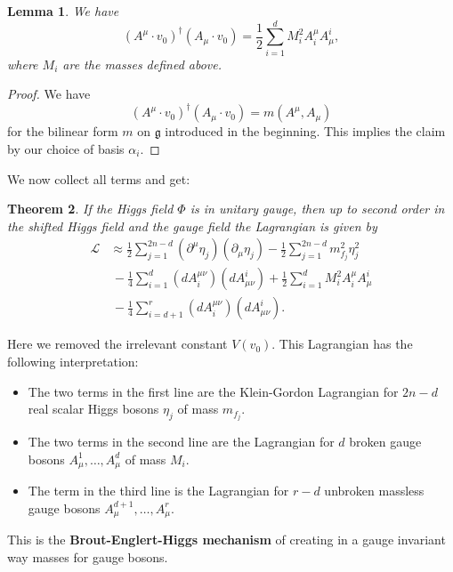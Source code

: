 \documentclass[11pt]{amsart}
\newtheorem{thm}{Theorem}[section]
\newtheorem{lem}[thm]{Lemma}
\theoremstyle{definition}
\theoremstyle{remark}
\numberwithin{equation}{section}
\begin{document}
\begin{lem}We have 
\begin{equation*}
\left(A^\mu\cdot v_0\right)^\dagger\left(A_\mu\cdot v_0\right)=\frac{1}{2}\sum_{i=1}^dM_i^2A_i^\mu A^i_\mu,
\end{equation*}
where $M_i$ are the masses defined above.
\end{lem}
\begin{proof}
We have 
\begin{equation*}
\left(A^\mu\cdot v_0\right)^\dagger\left(A_\mu\cdot v_0\right)=m(A^\mu,A_\mu)
\end{equation*}
for the bilinear form $m$ on $\mathfrak{g}$ introduced in the beginning. This implies the claim by our choice of basis $\alpha_i$.
\end{proof}
We now collect all terms and get:
\begin{thm}\label{thm combined Lag simply} If the Higgs field $\Phi$ is in unitary gauge, then up to second order in the shifted Higgs field and the gauge field the Lagrangian is given by 
\begin{align*}
\mathcal{L}&\approx\frac{1}{2}\sum_{j=1}^{2n-d}\left(\partial^\mu\eta_j\right)\left(\partial_\mu\eta_j\right)-\frac{1}{2}\sum_{j=1}^{2n-d}m_{f_j}^2\eta_j^2\\
&\,-\frac{1}{4}\sum_{i=1}^d\left(dA_i^{\mu\nu}\right)\left(dA^i_{\mu\nu}\right)+\frac{1}{2}\sum_{i=1}^dM_i^2A_i^\mu A^i_\mu\\
&\,-\frac{1}{4}\sum_{i=d+1}^r\left(dA_i^{\mu\nu}\right)\left(dA^i_{\mu\nu}\right).
\end{align*}
\end{thm}
Here we removed the irrelevant constant $V(v_0)$. This Lagrangian has the following interpretation:
\begin{itemize}
\item The two terms in the first line are the Klein-Gordon Lagrangian for $2n-d$ real scalar Higgs bosons $\eta_j$ of mass $m_{f_j}$.
\item The two terms in the second line are the Lagrangian for $d$ broken gauge bosons $A_\mu^1,\ldots,A_\mu^d$ of mass $M_i$.
\item The term in the third line is the Lagrangian for $r-d$ unbroken massless gauge bosons $A_\mu^{d+1},\ldots,A_\mu^r$.
\end{itemize}
This is the {\bf Brout-Englert-Higgs mechanism} of creating in a gauge invariant way masses for gauge bosons.
\end{document}
